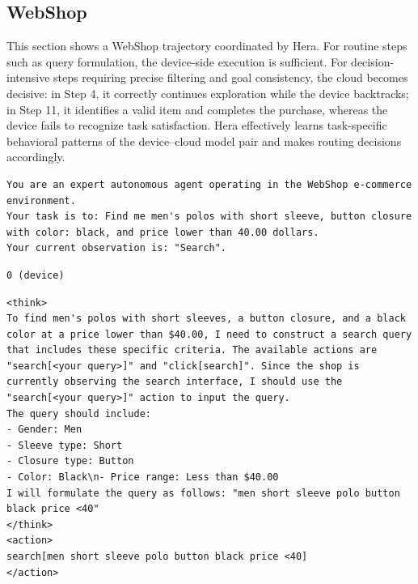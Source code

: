 \documentclass{article}
\newcommand{\name}{Hera\xspace}
\begin{document}
\subsection{WebShop}

This section shows a WebShop trajectory coordinated by \name. For routine steps such as query formulation, the device-side execution is sufficient. For decision-intensive steps requiring precise filtering and goal consistency, the cloud becomes decisive: in Step 4, it correctly continues exploration while the device backtracks; in Step 11, it identifies a valid item and completes the purchase, whereas the device fails to recognize task satisfaction. \name effectively learns task-specific behavioral patterns of the device--cloud model pair and makes routing decisions accordingly.

\begin{envbox}[title=Step 1: environment]
\begin{lstlisting}[style=mytt]
You are an expert autonomous agent operating in the WebShop e-commerce environment.
Your task is to: Find me men's polos with short sleeve, button closure with color: black, and price lower than 40.00 dollars.
Your current observation is: "Search".
\end{lstlisting}
\end{envbox}

\begin{herabox}[title=Step 1: Hera decision]
\begin{lstlisting}[style=mytt]
0 (device)
\end{lstlisting}
\end{herabox}

\begin{devicebox}[title=Step 1: device agent output]
\begin{lstlisting}[style=mytt]
<think>
To find men's polos with short sleeves, a button closure, and a black color at a price lower than $40.00, I need to construct a search query that includes these specific criteria. The available actions are "search[<your query>]" and "click[search]". Since the shop is currently observing the search interface, I should use the "search[<your query>]" action to input the query.
The query should include:
- Gender: Men
- Sleeve type: Short
- Closure type: Button
- Color: Black\n- Price range: Less than $40.00
I will formulate the query as follows: "men short sleeve polo button black price <40"
</think>
<action>
search[men short sleeve polo button black price <40]
</action>
\end{lstlisting}
\end{devicebox}
\end{document}
